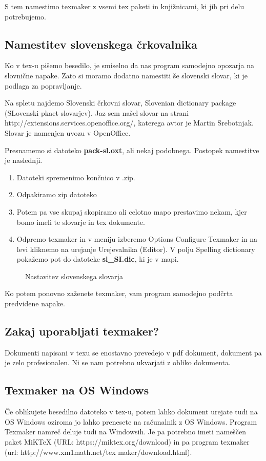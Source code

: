 \documentclass[12pt,a4paper,twoside]{article}
\begin{document}
S tem namestimo texmaker z vsemi tex paketi in knjižnicami, ki jih pri delu potrebujemo. 

\subsection{Namestitev slovenskega črkovalnika}
Ko v tex-u pišemo besedilo, je smiselno da nas program samodejno opozarja na slovnične napake. Zato si moramo dodatno namestiti še slovenski slovar, ki je podlaga za popravljanje. 

Na spletu najdemo Slovenski črkovni slovar, Slovenian dictionary package (SLovenski pkaet slovarjev). Jaz sem našel slovar na strani http://extensions.services.openoffice.org/, katerega avtor je Martin Srebotnjak. Slovar je namenjen uvozu v OpenOffice. 

Presnamemo si datoteko \textbf{pack-sl.oxt}, ali nekaj podobnega. Postopek namestitve je naslednji. 

\begin{enumerate}
\item {Datoteki spremenimo končnico v .zip.}
\item {Odpakiramo zip datoteko}
\item {Potem pa vse skupaj skopiramo ali celotno mapo prestavimo nekam, kjer bomo imeli te slovarje in tex dokumente.} 
\item {Odpremo texmaker in v meniju izberemo Options \/ Configure Texmaker \/ in na levi kliknemo na urejanje Urejevalnika (Editor). V polju Spelling dictionary pokažemo pot do datoteke \textbf{sl\_SI.dic}, ki je v mapi.} 
\end{enumerate}

\begin{figure}[h!] \centering
{}
\caption{Nastavitev slovenskega slovarja}
\label{slika:Nastavitev slovenskega slovarja}
\end{figure}

Ko potem ponovno zaženete texmaker, vam program samodejno podčrta predvidene napake. 

\subsection{Zakaj uporabljati texmaker?}
Dokumenti napisani v texu se enostavno prevedejo v pdf dokument, dokument pa je zelo profesionalen. Ni se nam potrebno ukvarjati z obliko dokumenta. 

\subsection{Texmaker na OS Windows}
Če oblikujete besedilno datoteko v tex-u, potem lahko dokument urejate tudi na OS Windows oziroma jo lahko prenesete na računalnik z OS Windows. Program Texmaker namreč deluje tudi na Windowsih. Je pa potrebno imeti nameščen paket MiKTeX (URL: https://miktex.org/download) in pa program texmaker (url: http://www.xm1math.net/tex maker/download.html). 
\end{document}
